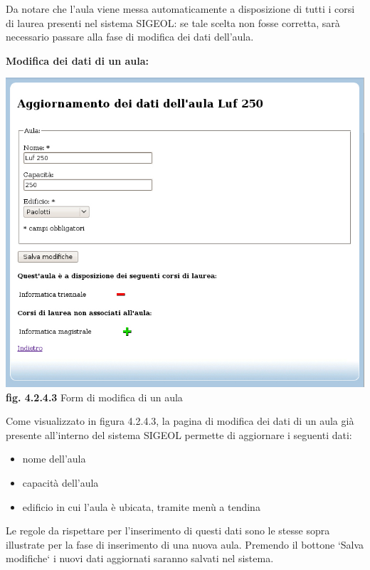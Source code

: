 \documentclass[11pt,a4paper]{article}
\begin{document}
Da notare che l'aula viene messa automaticamente a disposizione di tutti i corsi di laurea presenti nel sistema SIGEOL: se tale scelta non fosse corretta, sarà necessario passare alla fase di modifica dei dati dell'aula.
\newline \newline \newline
\begin{large}\textbf{Modifica dei dati di un aula:}\end{large}
\bigskip
\begin{center}
	\includegraphics[scale=0.5]{images/modifica_aula.jpg}\\
	\textbf{fig. 4.2.4.3} Form di modifica di un aula\\
\end{center}
\bigskip

Come visualizzato in figura 4.2.4.3, la pagina di modifica dei dati di un aula già presente all'interno del sistema SIGEOL permette di aggiornare i seguenti dati:
\begin{itemize}
 \item nome dell'aula
 \item capacità dell'aula
 \item edificio in cui l'aula è ubicata, tramite menù a tendina
\end{itemize}
Le regole da rispettare per l'inserimento di questi dati sono le stesse sopra illustrate per la fase di inserimento di una nuova aula.
Premendo il bottone `Salva modifiche` i nuovi dati aggiornati saranno salvati nel sistema.
\end{document}
